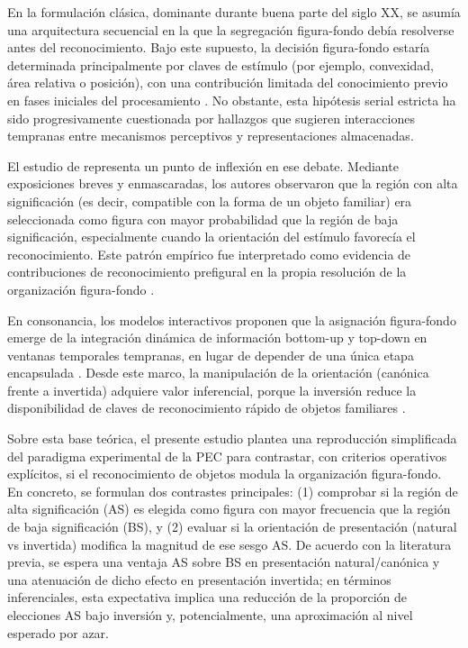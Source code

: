 \documentclass[stu, 12pt, letterpaper, donotrepeattitle, floatsintext, natbib]{apa7}
\begin{document}
En la formulación clásica, dominante durante buena parte del siglo XX, se asumía una arquitectura secuencial en la que la segregación figura-fondo debía resolverse antes del reconocimiento. Bajo este supuesto, la decisión figura-fondo estaría determinada principalmente por claves de estímulo (por ejemplo, convexidad, área relativa o posición), con una contribución limitada del conocimiento previo en fases iniciales del procesamiento \citep{rock1983logic}. No obstante, esta hipótesis serial estricta ha sido progresivamente cuestionada por hallazgos que sugieren interacciones tempranas entre mecanismos perceptivos y representaciones almacenadas.

El estudio de \citet{peterson1994must} representa un punto de inflexión en ese debate. Mediante exposiciones breves y enmascaradas, los autores observaron que la región con alta significación (es decir, compatible con la forma de un objeto familiar) era seleccionada como figura con mayor probabilidad que la región de baja significación, especialmente cuando la orientación del estímulo favorecía el reconocimiento. Este patrón empírico fue interpretado como evidencia de contribuciones de reconocimiento prefigural en la propia resolución de la organización figura-fondo \citep{peterson1994object}.

En consonancia, los modelos interactivos proponen que la asignación figura-fondo emerge de la integración dinámica de información bottom-up y top-down en ventanas temporales tempranas, en lugar de depender de una única etapa encapsulada \citep{vecera1998interactive}. Desde este marco, la manipulación de la orientación (canónica frente a invertida) adquiere valor inferencial, porque la inversión reduce la disponibilidad de claves de reconocimiento rápido de objetos familiares \citep{tarr1989mental}.

Sobre esta base teórica, el presente estudio plantea una reproducción simplificada del paradigma experimental de la PEC para contrastar, con criterios operativos explícitos, si el reconocimiento de objetos modula la organización figura-fondo. En concreto, se formulan dos contrastes principales: (1) comprobar si la región de alta significación (AS) es elegida como figura con mayor frecuencia que la región de baja significación (BS), y (2) evaluar si la orientación de presentación (natural vs invertida) modifica la magnitud de ese sesgo AS. De acuerdo con la literatura previa, se espera una ventaja AS sobre BS en presentación natural/canónica y una atenuación de dicho efecto en presentación invertida; en términos inferenciales, esta expectativa implica una reducción de la proporción de elecciones AS bajo inversión y, potencialmente, una aproximación al nivel esperado por azar.
\end{document}
